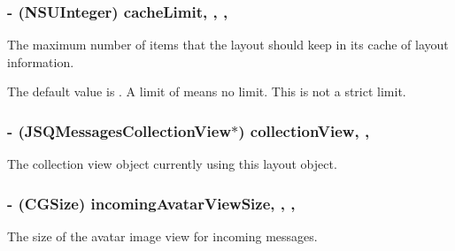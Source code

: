 \subsubsection[{cache\+Limit}]{\setlength{\rightskip}{0pt plus 5cm}-\/ (N\+S\+U\+Integer) cache\+Limit\hspace{0.3cm}{\ttfamily [read]}, {\ttfamily [write]}, {\ttfamily [nonatomic]}, {\ttfamily [assign]}}\label{interface_j_s_q_messages_collection_view_flow_layout_a997ac903872be7898fd5696e76aa4be9}
The maximum number of items that the layout should keep in its cache of layout information.

The default value is {}. A limit of {} means no limit. This is not a strict limit. \hypertarget{interface_j_s_q_messages_collection_view_flow_layout_a6f7171d412e190bbef0bd4b93d99da9d}{}
\subsubsection[{collection\+View}]{\setlength{\rightskip}{0pt plus 5cm}-\/ ({\bf J\+S\+Q\+Messages\+Collection\+View}$\ast$) collection\+View\hspace{0.3cm}{\ttfamily [read]}, {\ttfamily [nonatomic]}, {\ttfamily [assign]}}\label{interface_j_s_q_messages_collection_view_flow_layout_a6f7171d412e190bbef0bd4b93d99da9d}
The collection view object currently using this layout object. \hypertarget{interface_j_s_q_messages_collection_view_flow_layout_a5a94d2ca4118b4dd633f08d2251e2447}{}
\subsubsection[{incoming\+Avatar\+View\+Size}]{\setlength{\rightskip}{0pt plus 5cm}-\/ (C\+G\+Size) incoming\+Avatar\+View\+Size\hspace{0.3cm}{\ttfamily [read]}, {\ttfamily [write]}, {\ttfamily [nonatomic]}, {\ttfamily [assign]}}\label{interface_j_s_q_messages_collection_view_flow_layout_a5a94d2ca4118b4dd633f08d2251e2447}
The size of the avatar image view for incoming messages.

